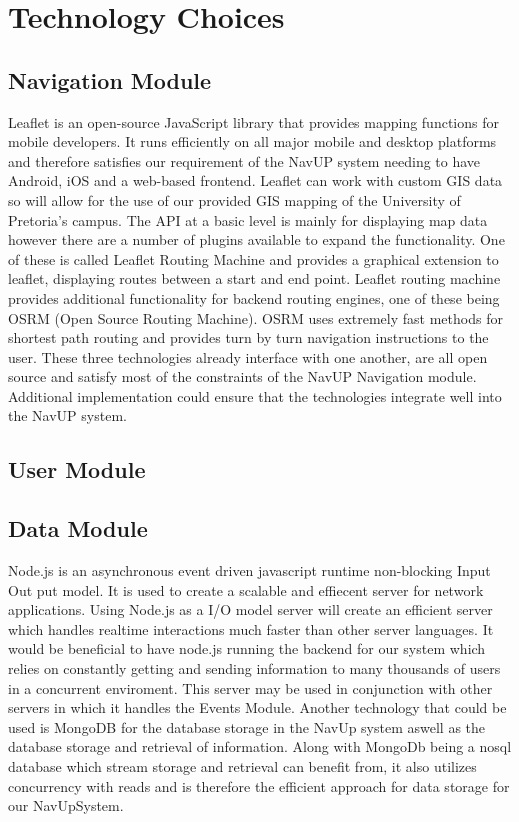 \documentclass[11pt]{article}
\begin{document}
\section{Technology Choices}

\subsection{Navigation Module}
Leaflet is an open-source JavaScript library that provides mapping functions for mobile developers. It runs efficiently on all major mobile and desktop platforms and therefore satisfies our requirement of the NavUP system needing to have Android, iOS and a web-based frontend. Leaflet can work with custom GIS data so will allow for the use of our provided GIS mapping of the University of Pretoria’s campus. The API at a basic level is mainly for displaying map data however there are a number of plugins available to expand the functionality. One of these is called Leaflet Routing Machine and provides a graphical extension to leaflet, displaying routes between a start and end point. Leaflet routing machine provides additional functionality for backend routing engines, one of these being OSRM (Open Source Routing Machine). OSRM uses extremely fast methods for shortest path routing and provides turn by turn navigation instructions to the user. These three technologies already interface with one another, are all open source and satisfy most of the constraints of the NavUP Navigation module. Additional implementation could ensure that the technologies integrate well into the NavUP system.

\subsection{User Module}

\subsection{Data Module}
Node.js is an asynchronous event driven javascript runtime non-blocking Input Out put model. It is used to create a scalable and effiecent server for network applications. Using Node.js as a I/O model server will create an efficient server which handles realtime interactions much faster than other server languages. It would be beneficial to have node.js running the backend for our system which relies on constantly getting and sending information to many thousands of users in a concurrent enviroment. This server may be used in conjunction with other servers in which it handles the Events Module. Another technology that could be used is MongoDB for the database storage in the NavUp system aswell as the database storage and retrieval of information. Along with MongoDb being a nosql database which stream storage and retrieval can benefit from, it also utilizes concurrency with reads and is therefore the efficient approach for data storage for our NavUpSystem.
\end{document}
